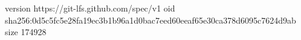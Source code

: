 version https://git-lfs.github.com/spec/v1
oid sha256:0d5c5fc5e28fa19ec3b1b96a1d0bac7eed60eeaf65e30ca378d6095c7624d9ab
size 174928
